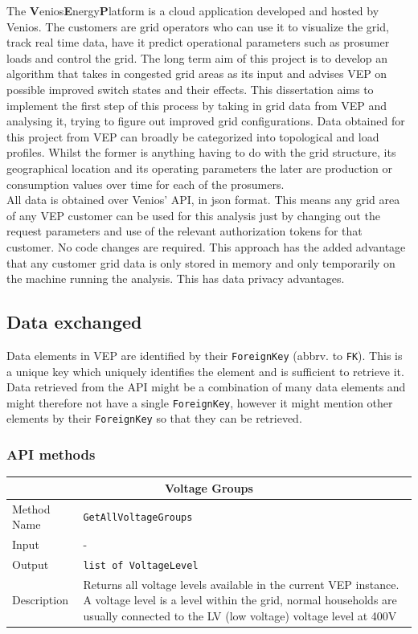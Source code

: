 The \textbf{V}enios\textbf{E}nergy\textbf{P}latform is a cloud application
developed and hosted by Venios. The customers are grid operators who can use
it to visualize the grid, track real time data, have it predict 
operational parameters such as prosumer loads and control the grid.
The long term aim of this project is to develop an algorithm that takes in
congested grid areas as its input and advises VEP on possible improved
switch states and their effects. This dissertation aims to implement the first step of this
process by taking in grid data from VEP and analysing it, trying to figure out
improved grid configurations. Data obtained for this project from VEP can broadly
be categorized
into topological and load profiles. Whilst the former is anything having to do with
the grid structure, its geographical location and its operating parameters the later
are production or consumption values over time for each of the prosumers.\\
All data is obtained over Venios' API, in json format. This means any
grid area of any VEP customer can be used for this analysis just by changing out
the request parameters and use of the relevant authorization tokens for that customer.
No code changes are required. This approach has the added advantage that any customer grid
data is only stored in memory and only temporarily on the machine running the analysis. This
has data privacy advantages.

\subsection{Data exchanged}

Data elements in VEP are identified by their \texttt{ForeignKey} (abbrv. to \texttt{FK}). This is a unique key which
uniquely identifies the element and is sufficient to retrieve it. Data retrieved from the API might
be a combination of many data elements and might therefore not have a single \texttt{ForeignKey}, however
it might mention other elements by their \texttt{ForeignKey} so that they can be retrieved.

\subsubsection{API methods}

\begin{tabular}{ l  p{12cm}} 
    \hline
    \multicolumn{2}{c}{\textbf{Voltage Groups}}\\
    \hline
    Method Name     & \texttt{GetAllVoltageGroups} \\
    Input           & -\\
    Output          & \texttt{list of VoltageLevel} \\
    Description     & Returns all voltage levels available in the current VEP instance. A voltage level is a level within the grid, normal households are usually connected to the LV (low voltage) voltage level at 400V\\
\end{tabular}

